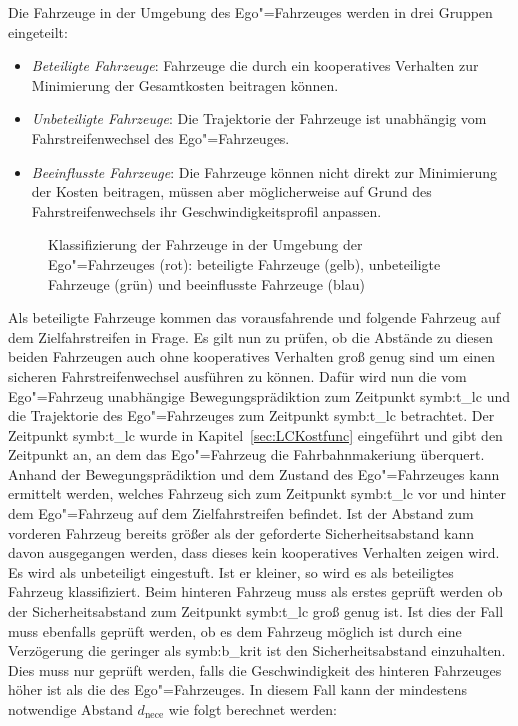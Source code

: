 Die Fahrzeuge in der Umgebung des Ego"=Fahrzeuges werden in drei Gruppen eingeteilt:
\begin{itemize}
\item \textit{Beteiligte Fahrzeuge}: Fahrzeuge die durch ein kooperatives Verhalten zur Minimierung der Gesamtkosten beitragen k\"onnen.
\item \textit{Unbeteiligte Fahrzeuge}: Die Trajektorie der Fahrzeuge ist unabh\"angig vom Fahrstreifenwechsel des Ego"=Fahrzeuges.
\item \textit{Beeinflusste Fahrzeuge}: Die Fahrzeuge k\"onnen nicht direkt zur Minimierung der Kosten beitragen, m\"ussen aber m\"oglicherweise auf Grund des Fahrstreifenwechsels ihr Geschwindigkeitsprofil anpassen.
\end{itemize}

\begin{figure}[!htbp]
    \centering
    \caption[Klassifizierung]{Klassifizierung der Fahrzeuge in der Umgebung der Ego"=Fahrzeuges (rot): beteiligte Fahrzeuge (gelb), unbeteiligte Fahrzeuge (gr\"un) und beeinflusste Fahrzeuge (blau)}
    \label{fig:Klassifizierung}
\end{figure}


Als beteiligte Fahrzeuge kommen das vorausfahrende und folgende Fahrzeug auf dem Zielfahrstreifen in Frage.
Es gilt nun zu pr\"ufen, ob die Abst\"ande zu diesen beiden Fahrzeugen auch ohne kooperatives Verhalten gro{\ss} genug sind um einen sicheren Fahrstreifenwechsel ausf\"uhren zu k\"onnen.
Daf\"ur wird nun die vom Ego"=Fahrzeug unabh\"angige Bewegungspr\"adiktion zum Zeitpunkt \gls{symb:t_lc} und die Trajektorie des Ego"=Fahrzeuges zum Zeitpunkt \gls{symb:t_lc} betrachtet.
Der Zeitpunkt \gls{symb:t_lc} wurde in Kapitel~\ref{sec:LCKostfunc} eingef\"uhrt und gibt den Zeitpunkt an, an dem das Ego"=Fahrzeug die Fahrbahnmakeriung \"uberquert.
Anhand der Bewegungspr\"adiktion und dem Zustand des Ego"=Fahrzeuges kann ermittelt werden, welches Fahrzeug sich zum Zeitpunkt \gls{symb:t_lc} vor und hinter dem Ego"=Fahrzeug auf dem Zielfahrstreifen befindet.
Ist der Abstand zum vorderen Fahrzeug bereits gr\"o{\ss}er als der geforderte Sicherheitsabstand kann davon ausgegangen werden, dass dieses kein kooperatives Verhalten zeigen wird.
Es wird als unbeteiligt eingestuft.
Ist er kleiner, so wird es als beteiligtes Fahrzeug klassifiziert.
Beim hinteren Fahrzeug muss als erstes gepr\"uft werden ob der Sicherheitsabstand zum Zeitpunkt \gls{symb:t_lc} gro{\ss} genug ist.
Ist dies der Fall muss ebenfalls gepr\"uft werden, ob es dem Fahrzeug m\"oglich ist durch eine Verz\"ogerung die geringer als \gls{symb:b_krit} ist den Sicherheitsabstand einzuhalten.
Dies muss nur gepr\"uft werden, falls die Geschwindigkeit des hinteren Fahrzeuges h\"oher ist als die des Ego"=Fahrzeuges.
In diesem Fall kann der mindestens notwendige Abstand \( d_\mathrm{nece} \) wie folgt berechnet werden:

